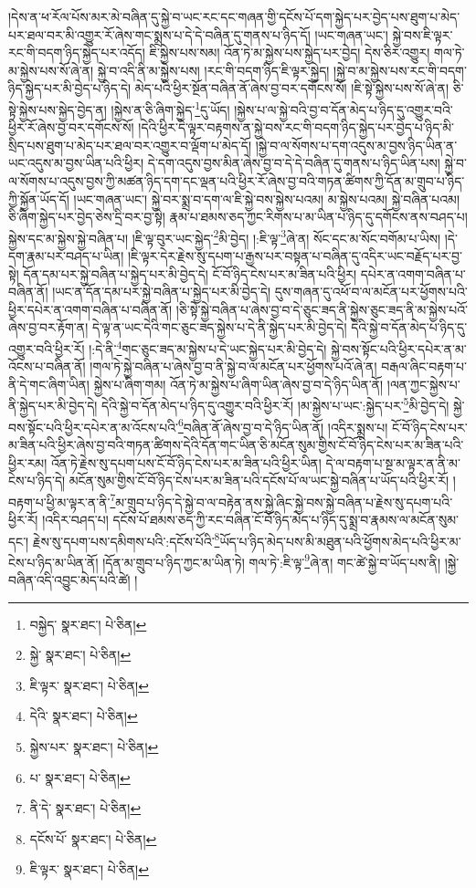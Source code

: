 །དེས་ན་ཕ་རོལ་པོས་མར་མེ་བཞིན་དུ་སྐྱེ་བ་ཡང་རང་དང་གཞན་གྱི་དངོས་པོ་དག་སྐྱེད་པར་བྱེད་པས་ཐུག་པ་མེད་པར་ཐལ་བར་མི་འགྱུར་རོ་ཞེས་གང་སྨྲས་པ་དེ་དེ་བཞིན་དུ་གནས་པ་ཉིད་དོ། །ཡང་གཞན་ཡང་། སྐྱེ་བས་ཇི་ལྟར་རང་གི་བདག་ཉིད་སྐྱེད་པར་འདོད། ཇི་སྐྱེས་པས་སམ། འོན་ཏེ་མ་སྐྱེས་པས་སྐྱེད་པར་བྱེད། དེས་ཅིར་འགྱུར། གལ་ཏེ་མ་སྐྱེས་པས་སོ་ཞེ་ན། སྐྱེ་བ་འདི་ནི་མ་སྐྱེས་པས། །རང་གི་བདག་ཉིད་ཇི་ལྟར་སྐྱེད། །སྐྱེ་བ་མ་སྐྱེས་པས་རང་གི་བདག་ཉིད་སྐྱེད་པར་མི་བྱེད་པ་ཉིད་དེ། མེད་པའི་ཕྱིར་སྔོན་བཞིན་ནོ་ཞེས་བྱ་བར་དགོངས་སོ། །ཇི་སྟེ་སྐྱེས་པས་སོ་ཞེ་ན། ཅི་སྟེ་སྐྱེས་པས་སྐྱེད་བྱེད་ན། །སྐྱེས་ན་ཅི་ཞིག་སྐྱེད་\footnote{བསྐྱེད་  སྣར་ཐང་།  པེ་ཅིན། }དུ་ཡོད། །སྐྱེས་པ་ལ་སྐྱེ་བའི་བྱ་བ་དོན་མེད་པ་ཉིད་དུ་འགྱུར་བའི་ཕྱིར་རོ་ཞེས་བྱ་བར་དགོངས་སོ། །དེའི་ཕྱིར་དེ་ལྟར་བརྟགས་ན་སྐྱེ་བས་རང་གི་བདག་ཉིད་སྐྱེད་པར་བྱེད་པ་ཉིད་མི་སྲིད་པས་ཐུག་པ་མེད་པར་ཐལ་བར་འགྱུར་བ་ལྡོག་པ་མེད་དོ། །སྐྱེ་བ་ལ་སོགས་པ་དག་འདུས་མ་བྱས་ཉིད་ཡིན་ན་ཡང་འདུས་མ་བྱས་ཡིན་པའི་ཕྱིར། དེ་དག་འདུས་བྱས་མིན་ཞེས་བྱ་བ་དེ་དེ་བཞིན་དུ་གནས་པ་ཉིད་ཡིན་པས། སྐྱེ་བ་ལ་སོགས་པ་འདུས་བྱས་ཀྱི་མཚན་ཉིད་དག་དང་ལྡན་པའི་ཕྱིར་རོ་ཞེས་བྱ་བའི་གཏན་ཚིགས་ཀྱི་དོན་མ་གྲུབ་པ་ཉིད་ཀྱི་སྐྱོན་ཡོད་དོ། །ཡང་གཞན་ཡང་། སྐྱེ་བར་སྨྲ་བ་དག་ལ་ཇི་སྐྱེ་བས་སྐྱེས་པའམ། མ་སྐྱེས་པའམ། སྐྱེ་བཞིན་པའམ། ཅི་ཞིག་སྐྱེད་པར་བྱེད་ཅེས་དྲི་བར་བྱ་སྟེ། རྣམ་པ་ཐམས་ཅད་ཀྱང་རིགས་པ་མ་ཡིན་པ་ཉིད་དུ་དགོངས་ནས་བཤད་པ། སྐྱེས་དང་མ་སྐྱེས་སྐྱེ་བཞིན་པ། །ཇི་ལྟ་བུར་ཡང་སྐྱེད་\footnote{སྐྱེ་  སྣར་ཐང་།  པེ་ཅིན། }མི་བྱེད། །:ཇི་ལྟ་\footnote{ཇི་ལྟར་  སྣར་ཐང་།  པེ་ཅིན། }ཞེ་ན། སོང་དང་མ་སོང་བགོམ་པ་ཡིས། །དེ་དག་རྣམ་པར་བཤད་པ་ཡིན། །ཇི་ལྟར་དེར་རྗེས་སུ་དཔག་པ་རྒྱས་པར་བསྟན་པ་བཞིན་དུ་འདིར་ཡང་བརྗོད་པར་བྱ་སྟེ། དོན་དམ་པར་སྐྱེ་བཞིན་པ་སྐྱེད་པར་མི་བྱེད་དེ། ངོ་བོ་ཉིད་ངེས་པར་མ་ཟིན་པའི་ཕྱིར། དཔེར་ན་འགག་བཞིན་པ་བཞིན་ནོ། །ཡང་ན་དོན་དམ་པར་སྐྱེ་བཞིན་པ་སྐྱེད་པར་མི་བྱེད་དེ། དུས་གཞན་དུ་འཕོ་བ་ལ་མངོན་པར་ཕྱོགས་པའི་ཕྱིར་དཔེར་ན་འགག་བཞིན་པ་བཞིན་ནོ། །ཅི་སྟེ་སྐྱེ་བཞིན་པ་ཞེས་བྱ་བ་དེ་ཅུང་ཟད་ནི་སྐྱེས་ཅུང་ཟད་ནི་མ་སྐྱེས་པའོ་ཞེས་བྱ་བར་རྟོག་ན། དེ་ལྟ་ན་ཡང་དེའི་གང་ཅུང་ཟད་སྐྱེས་པ་དེ་ནི་སྐྱེད་པར་མི་བྱེད་དེ། དེའི་སྐྱེ་བ་དོན་མེད་པ་ཉིད་དུ་འགྱུར་བའི་ཕྱིར་རོ། །:དེ་ནི་\footnote{དེའི་  སྣར་ཐང་།  པེ་ཅིན། }གང་ཅུང་ཟད་མ་སྐྱེས་པ་དེ་ཡང་སྐྱེད་པར་མི་བྱེད་དེ། སྐྱེ་བས་སྟོང་པའི་ཕྱིར་དཔེར་ན་མ་འོངས་པ་བཞིན་ནོ། །གལ་ཏེ་སྐྱེ་བཞིན་པ་ཞེས་བྱ་བ་ནི་སྐྱེ་བ་ལ་མངོན་པར་ཕྱོགས་པའོ་ཞེ་ན། བརྒལ་ཞིང་བརྟག་པ་ནི་དེ་གང་ཞིག་ཡིན། སྐྱེས་པ་ཞིག་གམ། འོན་ཏེ་མ་སྐྱེས་པ་ཞིག་ཡིན་ཞེས་བྱ་བ་དེ་ཉིད་ཡིན་ནོ། །ལན་ཀྱང་སྐྱེས་པ་ནི་སྐྱེད་པར་མི་བྱེད་དེ། དེའི་སྐྱེ་བ་དོན་མེད་པ་ཉིད་དུ་འགྱུར་བའི་ཕྱིར་རོ། །མ་སྐྱེས་པ་ཡང་:སྐྱེད་པར་\footnote{སྐྱེས་པར་  སྣར་ཐང་།  པེ་ཅིན། }མི་བྱེད་དེ། སྐྱེ་བས་སྟོང་པའི་ཕྱིར་དཔེར་ན་མ་འོངས་པའི་\footnote{པ་  སྣར་ཐང་།  པེ་ཅིན། }བཞིན་ནོ་ཞེས་བྱ་བ་དེ་ཉིད་ཡིན་ནོ། །འདིར་སྨྲས་པ། ངོ་བོ་ཉིད་ངེས་པར་མ་ཟིན་པའི་ཕྱིར་ཞེས་བྱ་བའི་གཏན་ཚིགས་དེའི་དོན་གང་ཡིན་ཅི་མངོན་སུམ་གྱིས་ངོ་བོ་ཉིད་ངེས་པར་མ་ཟིན་པའི་ཕྱིར་རམ། འོན་ཏེ་རྗེས་སུ་དཔག་པས་ངོ་བོ་ཉིད་ངེས་པར་མ་ཟིན་པའི་ཕྱིར་ཡིན། དེ་ལ་བརྟག་པ་སྔ་མ་ལྟར་ན་ནི་མ་ངེས་པ་ཉིད་དེ། མངོན་སུམ་གྱིས་ངོ་བོ་ཉིད་ངེས་པར་མ་ཟིན་པའི་དངོས་པོ་ལ་ཡང་སྐྱེ་བཞིན་པ་ཡོད་པའི་ཕྱིར་རོ། །བརྟག་པ་ཕྱི་མ་ལྟར་ན་ནི་\footnote{ནི་དེ་  སྣར་ཐང་།  པེ་ཅིན། }མ་གྲུབ་པ་ཉིད་དེ་སྐྱེ་བ་ལ་བརྟེན་ནས་སྐྱེ་ཞིང་སྐྱེ་བས་སྐྱེ་བཞིན་པ་རྗེས་སུ་དཔག་པའི་ཕྱིར་རོ། །འདིར་བཤད་པ། དངོས་པོ་ཐམས་ཅད་ཀྱི་རང་བཞིན་ངོ་བོ་ཉིད་མེད་པ་ཉིད་དུ་སྨྲ་བ་རྣམས་ལ་མངོན་སུམ་དང་། རྗེས་སུ་དཔག་པས་དམིགས་པའི་:དངོས་པོའི་\footnote{དངོས་པོ་  སྣར་ཐང་།  པེ་ཅིན། }ཡོད་པ་ཉིད་མེད་པས་མི་མཐུན་པའི་ཕྱོགས་མེད་པའི་ཕྱིར་མ་ངེས་པ་ཉིད་མ་ཡིན་ནོ། །དོན་མ་གྲུབ་པ་ཉིད་ཀྱང་མ་ཡིན་ཏེ། གལ་ཏེ་:ཇི་ལྟ་\footnote{ཇི་ལྟར་  སྣར་ཐང་།  པེ་ཅིན། }ཞེ་ན། གང་ཚེ་སྐྱེ་བ་ཡོད་པས་ནི། །སྐྱེ་བཞིན་འདི་འབྱུང་མེད་པའི་ཚེ། །
